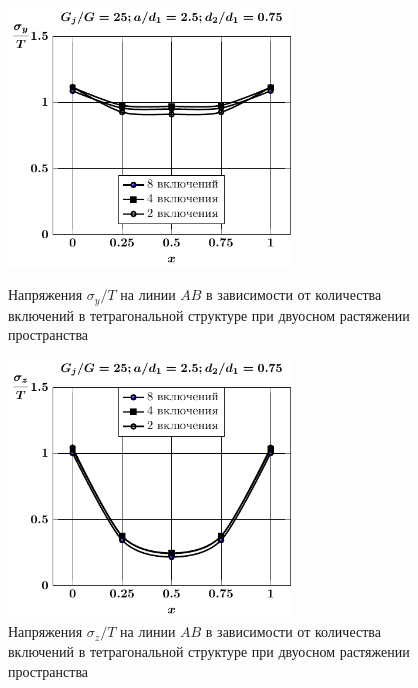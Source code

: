 \begin{figure}[h!]
\centering\footnotesize
\parbox[b]{7.5cm}{\centering\includegraphics[width=7.5cm]{inc8-4-2-a25-d75-g25-sig_y-spheroids-tension2.pdf}
\caption{Напряжения $\sigma_y/T$ на линии $AB$ в зависимости от количества включений в тетрагональной структуре при двуосном растяжении пространства
\label{f:9:24}}}\hfil\hfil
\parbox[b]{7.5cm}{\centering\includegraphics[width=7.5cm]{inc8-4-2-a25-d75-g25-sig_z-spheroids-tension2.pdf}
\caption{Напряжения $\sigma_z/T$ на линии $AB$ в зависимости от количества включений в тетрагональной структуре при двуосном растяжении пространства
\label{f:9:25}}}
\end{figure}

%

